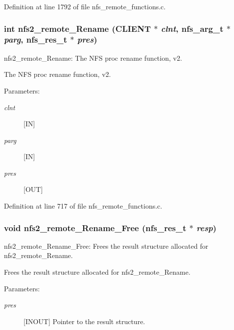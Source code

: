 Definition at line 1792 of file nfs\_\-remote\_\-functions.c.
\subsubsection[{nfs2\_\-remote\_\-Rename}]{\setlength{\rightskip}{0pt plus 5cm}int nfs2\_\-remote\_\-Rename (CLIENT $\ast$ {\em clnt}, \/  nfs\_\-arg\_\-t $\ast$ {\em parg}, \/  nfs\_\-res\_\-t $\ast$ {\em pres})}\label{group__NFSprocs_g4e6b032d4495a4d6c510c4b244316d09}


nfs2\_\-remote\_\-Rename: The NFS proc rename function, v2.

The NFS proc rename function, v2.

\begin{Desc}
\item[Parameters:]
\begin{description}
\item[{\em clnt}][IN] \item[{\em parg}][IN] \item[{\em pres}][OUT] \end{description}
\end{Desc}


Definition at line 717 of file nfs\_\-remote\_\-functions.c.
\subsubsection[{nfs2\_\-remote\_\-Rename\_\-Free}]{\setlength{\rightskip}{0pt plus 5cm}void nfs2\_\-remote\_\-Rename\_\-Free (nfs\_\-res\_\-t $\ast$ {\em resp})}\label{group__NFSprocs_ga709a659e9a83e6a9c5c6c318efbca62}


nfs2\_\-remote\_\-Rename\_\-Free: Frees the result structure allocated for nfs2\_\-remote\_\-Rename.

Frees the result structure allocated for nfs2\_\-remote\_\-Rename.

\begin{Desc}
\item[Parameters:]
\begin{description}
\item[{\em pres}][INOUT] Pointer to the result structure. \end{description}
\end{Desc}


